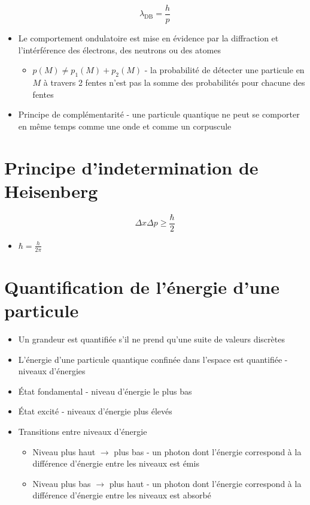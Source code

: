 \documentclass[openany]{book}
\begin{document}
\[ \lambda_{\text{DB}} = \frac{h}{p} \]

\begin{itemize}
    \item Le comportement ondulatoire est mise en évidence par la diffraction et l'intérférence des électrons, des neutrons ou des atomes
    \begin{itemize}
        \item $p(M) \neq p_1(M) + p_2(M)$ - la probabilité de détecter une particule en $M$ à travers 2 fentes n'est pas la somme des probabilités pour chacune des fentes
    \end{itemize}
    \item Principe de complémentarité - une particule quantique ne peut se comporter en même temps comme une onde et comme un corpuscule
\end{itemize}

\section{Principe d'indetermination de Heisenberg}
\[ \Delta x \Delta p \geq \frac{\hbar}{2} \]

\begin{itemize}
    \item $\hbar = \frac{h}{2\pi}$
\end{itemize}

\section{Quantification de l'énergie d'une particule}

\begin{itemize}
    \item Un grandeur est quantifiée s'il ne prend qu'une suite de valeurs discrètes
    \item L'énergie d'une particule quantique confinée dans l'espace est quantifiée - niveaux d'énergies
    \item État fondamental - niveau d'énergie le plus bas
    \item État excité - niveaux d'énergie plus élevés
    \item Transitions entre niveaux d'énergie
    \begin{itemize}
        \item Niveau plus haut $\rightarrow$ plus bas - un photon dont l'énergie correspond à la différence d'énergie entre les niveaux est émis
        \item Niveau plus bas $\rightarrow$ plus haut - un photon dont l'énergie correspond à la différence d'énergie entre les niveaux est absorbé
    \end{itemize}
\end{itemize}
\end{document}
